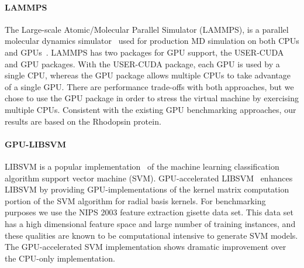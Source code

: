 \paragraph {LAMMPS} The Large-scale Atomic/Molecular Parallel Simulator
(LAMMPS), is a parallel molecular
dynamics simulator~\cite{LAMMPS,Plimpton1995} used for production MD simulation
on both CPUs and GPUs~\cite{LAMMPSGPU}.  LAMMPS has two packages for GPU
support, the USER-CUDA and GPU packages.
With the USER-CUDA package, each GPU is used by a single CPU, whereas the GPU
package allows multiple CPUs to take advantage of a single GPU.  There are
performance trade-offs with both approaches, but we chose to use the GPU package
in order to stress the virtual machine by exercising multiple CPUs.  Consistent
with the existing GPU benchmarking approaches, our results are based on the
Rhodopsin protein.


\paragraph{GPU-LIBSVM} LIBSVM is a popular implementation~\cite{Chang:2011} of
the machine learning classification algorithm support vector machine
(SVM). GPU-accelerated LIBSVM~\cite{Athanasopoulos:2011} enhances LIBSVM by
providing GPU-implementations of the kernel matrix computation portion of the
SVM algorithm for radial basis kernels. For benchmarking purposes we use the
NIPS 2003 feature extraction gisette data set. This data set has a high
dimensional feature space and large number of training instances, and these
qualities are known to be computational intensive to generate SVM models. The
GPU-accelerated SVM implementation shows dramatic improvement over the CPU-only
implementation.


